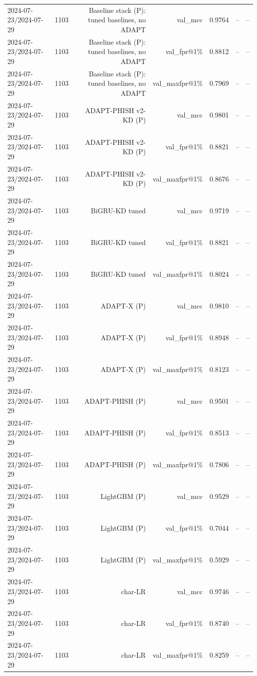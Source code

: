 \begin{table}[t]
\begin{tabular}{llrrrrr}
2024-07-23/2024-07-29 & 1103 & Baseline stack (P): tuned baselines, no ADAPT & val\_mcc & 0.9764 & -- & -- \\
2024-07-23/2024-07-29 & 1103 & Baseline stack (P): tuned baselines, no ADAPT & val\_fpr@1\% & 0.8812 & -- & -- \\
2024-07-23/2024-07-29 & 1103 & Baseline stack (P): tuned baselines, no ADAPT & val\_maxfpr@1\% & 0.7969 & -- & -- \\
2024-07-23/2024-07-29 & 1103 & ADAPT-PHISH v2-KD (P) & val\_mcc & 0.9801 & -- & -- \\
2024-07-23/2024-07-29 & 1103 & ADAPT-PHISH v2-KD (P) & val\_fpr@1\% & 0.8821 & -- & -- \\
2024-07-23/2024-07-29 & 1103 & ADAPT-PHISH v2-KD (P) & val\_maxfpr@1\% & 0.8676 & -- & -- \\
2024-07-23/2024-07-29 & 1103 & BiGRU-KD tuned & val\_mcc & 0.9719 & -- & -- \\
2024-07-23/2024-07-29 & 1103 & BiGRU-KD tuned & val\_fpr@1\% & 0.8821 & -- & -- \\
2024-07-23/2024-07-29 & 1103 & BiGRU-KD tuned & val\_maxfpr@1\% & 0.8024 & -- & -- \\
2024-07-23/2024-07-29 & 1103 & ADAPT-X (P) & val\_mcc & 0.9810 & -- & -- \\
2024-07-23/2024-07-29 & 1103 & ADAPT-X (P) & val\_fpr@1\% & 0.8948 & -- & -- \\
2024-07-23/2024-07-29 & 1103 & ADAPT-X (P) & val\_maxfpr@1\% & 0.8123 & -- & -- \\
2024-07-23/2024-07-29 & 1103 & ADAPT-PHISH (P) & val\_mcc & 0.9501 & -- & -- \\
2024-07-23/2024-07-29 & 1103 & ADAPT-PHISH (P) & val\_fpr@1\% & 0.8513 & -- & -- \\
2024-07-23/2024-07-29 & 1103 & ADAPT-PHISH (P) & val\_maxfpr@1\% & 0.7806 & -- & -- \\
2024-07-23/2024-07-29 & 1103 & LightGBM (P) & val\_mcc & 0.9529 & -- & -- \\
2024-07-23/2024-07-29 & 1103 & LightGBM (P) & val\_fpr@1\% & 0.7044 & -- & -- \\
2024-07-23/2024-07-29 & 1103 & LightGBM (P) & val\_maxfpr@1\% & 0.5929 & -- & -- \\
2024-07-23/2024-07-29 & 1103 & char-LR & val\_mcc & 0.9746 & -- & -- \\
2024-07-23/2024-07-29 & 1103 & char-LR & val\_fpr@1\% & 0.8740 & -- & -- \\
2024-07-23/2024-07-29 & 1103 & char-LR & val\_maxfpr@1\% & 0.8259 & -- & -- \\

\end{tabular}
\end{table}
